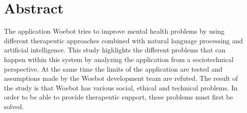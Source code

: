 \section*{Abstract}
The application Woebot tries to improve mental health problems by using different therapeutic approaches combined with natural language processing and artificial intelligence.
This study highlights the different problems that can happen within this system by analyzing the application from a sociotechnical perspective.
At the same time the limits of the application are tested and assumptions made by the Woebot development team are refuted.
The result of the study is that Woebot has various social, ethical and technical problems.
In order to be able to provide therapeutic support, these problems must first be solved.
